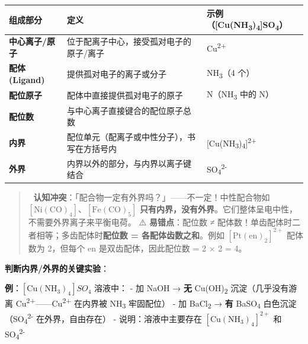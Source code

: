 \documentclass[a4paper,11pt]{ctexart}
\newcounter{none}
\begin{document}
{\def\LTcaptype{none} %
\begin{longtable}[]{@{}
  >{\raggedright\arraybackslash}p{}
  >{\raggedright\arraybackslash}p{}
  >{\raggedright\arraybackslash}p{}@{}}
\toprule\noalign{}
\begin{minipage}[b]{\linewidth}\raggedright
组成部分
\end{minipage} & \begin{minipage}[b]{\linewidth}\raggedright
定义
\end{minipage} & \begin{minipage}[b]{\linewidth}\raggedright
示例（{[}Cu(NH\textsubscript{3})\textsubscript{4}{]}SO\textsubscript{4}）
\end{minipage} \\
\midrule\noalign{}
\endhead
\bottomrule\noalign{}
\endlastfoot
\textbf{中心离子/原子} & 位于配离子中心，接受孤对电子的原子/离子 & Cu\textsuperscript{2+} \\
\textbf{配体 (Ligand)} & 提供孤对电子的离子或分子 & NH\textsubscript{3}（4 个） \\
\textbf{配位原子} & 配体中直接提供孤对电子的原子 & N（NH\textsubscript{3} 中的 N） \\
\textbf{配位数} & 与中心离子直接键合的配位原子总数 & 4 \\
\textbf{内界} & 配位单元（配离子或中性分子），书写在方括号内 & {[}Cu(NH\textsubscript{3})\textsubscript{4}{]}\textsuperscript{2+} \\
\textbf{外界} & 内界以外的部分，与内界以离子键结合 & SO\textsubscript{4}\textsuperscript{2-} \\
\end{longtable}
}

\begin{quote}
🧠 \textbf{认知冲突}：「配合物一定有外界吗？」------不一定！中性配合物如 \([\mathrm{Ni(CO)_4}]\)、\([\mathrm{Fe(CO)_5}]\) \textbf{只有内界，没有外界}。它们整体呈电中性，不需要外界离子来平衡电荷。
⚠️ \textbf{易错点}：配位数 ≠ 配体数！单齿配体时二者相等；多齿配体时\textbf{配位数 = 各配体齿数之和}。例如 \([\mathrm{Pt(en)_2}]^{2+}\) 配体数为 2，但每个 en 是双齿配体，因此配位数 = 2 × 2 = 4。
\end{quote}

\textbf{判断内界/外界的关键实验}：

\textbf{例}：\([\mathrm{Cu(NH_3)_4}]SO_4\) 溶液中：
- 加 NaOH → \textbf{无} Cu(OH)\textsubscript{2} 沉淀（几乎没有游离 Cu\textsuperscript{2+}------Cu\textsuperscript{2+} 在内界被 NH\textsubscript{3} 牢固配位）
- 加 BaCl\textsubscript{2} → \textbf{有} BaSO\textsubscript{4} 白色沉淀（SO\textsubscript{4}\textsuperscript{2-} 在外界，自由存在）
- 说明：溶液中主要存在 \([\mathrm{Cu(NH_3)_4}]^{2+}\) 和 SO\textsubscript{4}\textsuperscript{2-}
\end{document}
